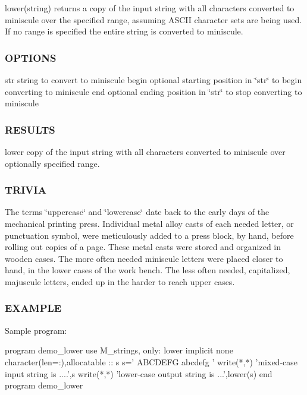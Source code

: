 lower(string) returns a copy of the input string with all characters converted to miniscule over the specified range, assuming A\+S\+C\+II character sets are being used. If no range is specified the entire string is converted to miniscule.

\subsubsection*{O\+P\+T\+I\+O\+NS}

str string to convert to miniscule begin optional starting position in \char`\"{}str\char`\"{} to begin converting to miniscule end optional ending position in \char`\"{}str\char`\"{} to stop converting to miniscule

\subsubsection*{R\+E\+S\+U\+L\+TS}

lower copy of the input string with all characters converted to miniscule over optionally specified range.

\subsubsection*{T\+R\+I\+V\+IA}

The terms \char`\"{}uppercase\char`\"{} and \char`\"{}lowercase\char`\"{} date back to the early days of the mechanical printing press. Individual metal alloy casts of each needed letter, or punctuation symbol, were meticulously added to a press block, by hand, before rolling out copies of a page. These metal casts were stored and organized in wooden cases. The more often needed miniscule letters were placed closer to hand, in the lower cases of the work bench. The less often needed, capitalized, majuscule letters, ended up in the harder to reach upper cases.

\subsubsection*{E\+X\+A\+M\+P\+LE}

Sample program\+: \begin{DoxyVerb}program demo_lower
use M_strings, only: lower
implicit none
character(len=:),allocatable  :: s
   s=' ABCDEFG abcdefg '
   write(*,*) 'mixed-case input string is ....',s
   write(*,*) 'lower-case output string is ...',lower(s)
end program demo_lower
\end{DoxyVerb}


